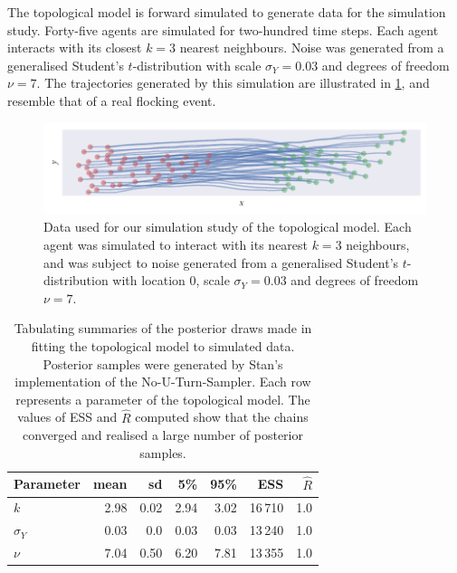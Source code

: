 The topological model is forward simulated to generate data for the simulation
study. Forty-five agents are simulated for two-hundred time steps. Each agent
interacts with its closest $k=3$ nearest neighbours. Noise was generated from a
generalised Student's $t$-distribution with scale $\sigma_Y=0.03$ and degrees
of freedom $\nu=7$. The trajectories generated by this simulation are
illustrated in \cref{fig:top_sim}, and resemble that of a real flocking event.

\begin{figure}[tbp]
  \includegraphics{top_sim.pdf}
  \caption{Data used for our simulation study of the topological model. Each
    agent was simulated to interact with its nearest $k=3$ neighbours, and
    was subject to noise generated from a generalised Student's
    $t$-distribution with location $0$, scale $\sigma_Y=0.03$ and degrees of
    freedom $\nu=7$.}
  \label{fig:top_sim}
\end{figure}
\begin{table}[tbp]
  \begin{tabular}{@{}lrrrrrr@{}}
    \toprule
    Parameter    & mean & sd   & 5\%  & 95\% & ESS     & $\widehat{R}$ \\
    \midrule
    $k$          & 2.98 & 0.02 & 2.94 & 3.02 & 16\,710 & 1.0           \\
    $\sigma_{Y}$ & 0.03 & 0.0  & 0.03 & 0.03 & 13\,240 & 1.0           \\
    $\nu$        & 7.04 & 0.50 & 6.20 & 7.81 & 13\,355 & 1.0           \\
    \bottomrule
  \end{tabular}
  \caption{Tabulating summaries of the posterior draws made in fitting the
    topological model to simulated data. Posterior samples were generated by
    Stan's implementation of the No-U-Turn-Sampler. Each row represents a
    parameter of the topological model. The values of ESS and $\widehat{R}$
    computed show that the chains converged and realised a large number of
    posterior samples.}
  \label{tab:top_summary}
\end{table}
